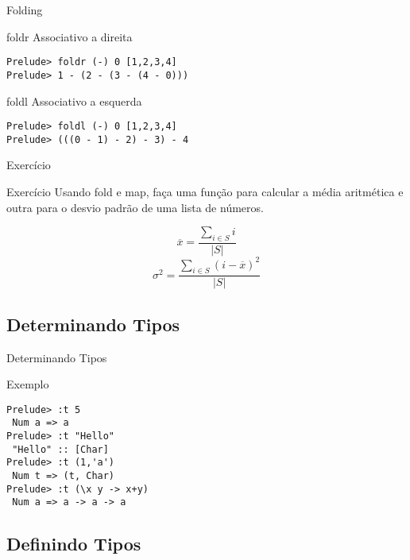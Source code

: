 \documentclass{beamer}
\begin{document}
	\begin{frame}[fragile]{Folding}
	 \begin{block}{foldr}
	  Associativo a direita
	  \begin{lstlisting}
Prelude> foldr (-) 0 [1,2,3,4]
Prelude> 1 - (2 - (3 - (4 - 0)))
	  \end{lstlisting}
	 \end{block}
	 
	 \begin{block}{foldl}
	  Associativo a esquerda
	  \begin{lstlisting}
Prelude> foldl (-) 0 [1,2,3,4]
Prelude> (((0 - 1) - 2) - 3) - 4
	  \end{lstlisting}
	 \end{block}
	\end{frame}
	
	\begin{frame}{Exercício}
	 \begin{block}{Exercício}
	  Usando fold e map, faça uma função para calcular a média aritmética e outra para o desvio padrão de uma lista de números. 
	 \end{block}
	 
	  \[ \overline{x} = \frac{\sum\limits_{i \in S}i}{\left|S\right|} \]
	  \[ \sigma^2 = \frac{\sum\limits_{i \in S}(i - \overline{x})^2}{\left|S\right|} \]	 

	\end{frame}
	
	\subsection{Determinando Tipos}
		\begin{frame}[fragile]{Determinando Tipos}
		 \begin{block}{Exemplo}
		 \begin{lstlisting}
Prelude> :t 5
 Num a => a
Prelude> :t "Hello"
 "Hello" :: [Char]
Prelude> :t (1,'a')
 Num t => (t, Char)
Prelude> :t (\x y -> x+y)
 Num a => a -> a -> a
		 \end{lstlisting}
		 \end{block}
		\end{frame}
		
	\subsection{Definindo Tipos}
	
\end{document}
